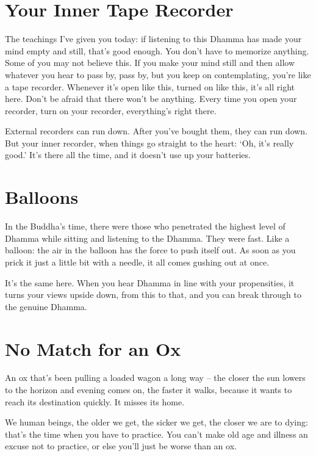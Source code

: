 \clearpage

\section{Your Inner Tape Recorder}

The teachings I've given you today: if listening to this Dhamma has made your mind empty and still, that's good enough. You don't have to memorize anything. Some of you may not believe this. If you make your mind still and then allow whatever you hear to pass by, pass by, but you keep on contemplating, you're like a tape recorder. Whenever it's open like this, turned on like this, it's all right here. Don't be afraid that there won't be anything. Every time you open your recorder, turn on your recorder, everything's right there.

External recorders can run down. After you've bought them, they can run down. But your inner recorder, when things go straight to the heart: `Oh, it's really good.' It's there all the time, and it doesn't use up your batteries.

\clearpage

\section{Balloons}

In the Buddha's time, there were those who penetrated the highest level of Dhamma while sitting and listening to the Dhamma. They were fast. Like a balloon: the air in the balloon has the force to push itself out. As soon as you prick it just a little bit with a needle, it all comes gushing out at once.

It's the same here. When you hear Dhamma in line with your propensities, it turns your views upside down, from this to that, and you can break through to the genuine Dhamma.

\section{No Match for an Ox}

An ox that's been pulling a loaded wagon a long way -- the closer the sun lowers to the horizon and evening comes on, the faster it walks, because it wants to reach its destination quickly. It misses its home. 

We human beings, the older we get, the sicker we get, the closer we are to dying: that's the time when you have to practice. You can't make old age and illness an excuse not to practice, or else you'll just be worse than an ox.

